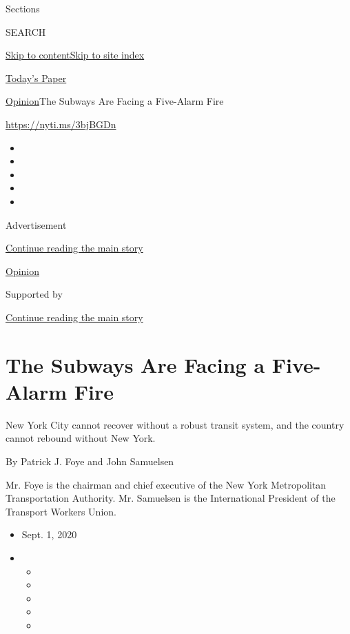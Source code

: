 Sections

SEARCH

\protect\hyperlink{site-content}{Skip to
content}\protect\hyperlink{site-index}{Skip to site index}

\href{https://myaccount.nytimes3xbfgragh.onion/auth/login?response_type=cookie\&client_id=vi}{}

\href{https://www.nytimes3xbfgragh.onion/section/todayspaper}{Today's
Paper}

\href{/section/opinion}{Opinion}\textbar{}The Subways Are Facing a
Five-Alarm Fire

\url{https://nyti.ms/3bjBGDn}

\begin{itemize}
\item
\item
\item
\item
\item
\end{itemize}

Advertisement

\protect\hyperlink{after-top}{Continue reading the main story}

\href{/section/opinion}{Opinion}

Supported by

\protect\hyperlink{after-sponsor}{Continue reading the main story}

\hypertarget{the-subways-are-facing-a-five-alarm-fire}{%
\section{The Subways Are Facing a Five-Alarm
Fire}\label{the-subways-are-facing-a-five-alarm-fire}}

New York City cannot recover without a robust transit system, and the
country cannot rebound without New York.

By Patrick J. Foye and John Samuelsen

Mr. Foye is the chairman and chief executive of the New York
Metropolitan Transportation Authority. Mr. Samuelsen is the
International President of the Transport Workers Union.

\begin{itemize}
\item
  Sept. 1, 2020
\item
  \begin{itemize}
  \item
  \item
  \item
  \item
  \item
  \end{itemize}
\end{itemize}

